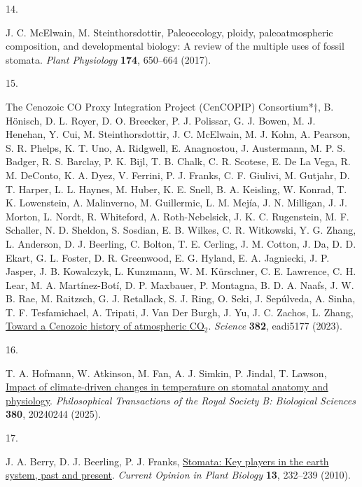 \documentclass[
  letterpaper,
  DIV=11,
  numbers=noendperiod]{scrartcl}
\newlength{\cslhangindent}
\newlength{\csllabelwidth}
\newenvironment{CSLReferences}[2] %
 {\begin{list}{}{%
  \setlength{\itemindent}{0pt}
  \setlength{\leftmargin}{0pt}
  \setlength{\parsep}{0pt}
  \ifodd #1
   \setlength{\leftmargin}{\cslhangindent}
   \setlength{\itemindent}{-1\cslhangindent}
  \fi
  \setlength{\itemsep}{#2\baselineskip}}}
 {\end{list}}
\newcommand{\CSLLeftMargin}[1]{\parbox[t]{\csllabelwidth}{\strut#1\strut}}
\newcommand{\CSLRightInline}[1]{\parbox[t]{\linewidth - \csllabelwidth}{\strut#1\strut}}
\begin{document}
\begin{CSLReferences}{0}{1}
\CSLLeftMargin{14. }%
\CSLRightInline{J. C. McElwain, M. Steinthorsdottir, Paleoecology,
ploidy, paleoatmospheric composition, and developmental biology: A
review of the multiple uses of fossil stomata. \emph{Plant Physiology}
\textbf{174}, 650--664 (2017).}

\CSLLeftMargin{15. }%
\CSLRightInline{The Cenozoic CO Proxy Integration Project (CenCOPIP)
Consortium*†, B. Hönisch, D. L. Royer, D. O. Breecker, P. J. Polissar,
G. J. Bowen, M. J. Henehan, Y. Cui, M. Steinthorsdottir, J. C. McElwain,
M. J. Kohn, A. Pearson, S. R. Phelps, K. T. Uno, A. Ridgwell, E.
Anagnostou, J. Austermann, M. P. S. Badger, R. S. Barclay, P. K. Bijl,
T. B. Chalk, C. R. Scotese, E. De La Vega, R. M. DeConto, K. A. Dyez, V.
Ferrini, P. J. Franks, C. F. Giulivi, M. Gutjahr, D. T. Harper, L. L.
Haynes, M. Huber, K. E. Snell, B. A. Keisling, W. Konrad, T. K.
Lowenstein, A. Malinverno, M. Guillermic, L. M. Mejía, J. N. Milligan,
J. J. Morton, L. Nordt, R. Whiteford, A. Roth-Nebelsick, J. K. C.
Rugenstein, M. F. Schaller, N. D. Sheldon, S. Sosdian, E. B. Wilkes, C.
R. Witkowski, Y. G. Zhang, L. Anderson, D. J. Beerling, C. Bolton, T. E.
Cerling, J. M. Cotton, J. Da, D. D. Ekart, G. L. Foster, D. R.
Greenwood, E. G. Hyland, E. A. Jagniecki, J. P. Jasper, J. B. Kowalczyk,
L. Kunzmann, W. M. Kürschner, C. E. Lawrence, C. H. Lear, M. A.
Martínez-Botí, D. P. Maxbauer, P. Montagna, B. D. A. Naafs, J. W. B.
Rae, M. Raitzsch, G. J. Retallack, S. J. Ring, O. Seki, J. Sepúlveda, A.
Sinha, T. F. Tesfamichael, A. Tripati, J. Van Der Burgh, J. Yu, J. C.
Zachos, L. Zhang, \href{https://doi.org/10.1126/science.adi5177}{Toward
a {Cenozoic} history of atmospheric {CO}\(_{\textrm{2}}\)}.
\emph{Science} \textbf{382}, eadi5177 (2023).}

\CSLLeftMargin{16. }%
\CSLRightInline{T. A. Hofmann, W. Atkinson, M. Fan, A. J. Simkin, P.
Jindal, T. Lawson, \href{https://doi.org/10.1098/rstb.2024.0244}{Impact
of climate-driven changes in temperature on stomatal anatomy and
physiology}. \emph{Philosophical Transactions of the Royal Society B:
Biological Sciences} \textbf{380}, 20240244 (2025).}

\CSLLeftMargin{17. }%
\CSLRightInline{J. A. Berry, D. J. Beerling, P. J. Franks,
\href{https://doi.org/10.1016/j.pbi.2010.04.013}{Stomata: Key players in
the earth system, past and present}. \emph{Current Opinion in Plant
Biology} \textbf{13}, 232--239 (2010).}


\end{CSLReferences}
\end{document}

